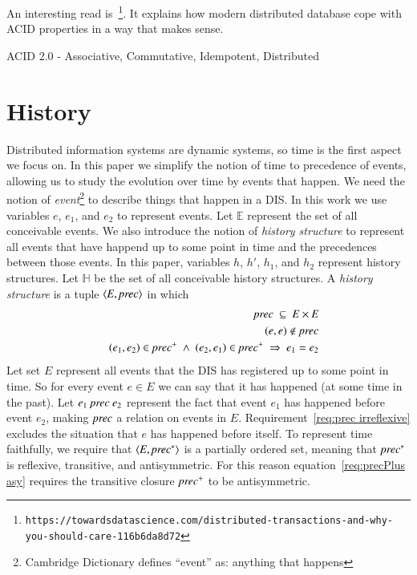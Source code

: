 \documentclass{elsarticle}
\def\id#1{\text{\em #1\/}}
\def\Events{{\mathit E}}
\begin{document}
	An interesting read is~\cite{Foster17c}\footnote{\tt\tiny https://towardsdatascience.com/distributed-transactions-and-why-you-should-care-116b6da8d72}.
	It explains how modern distributed database cope with ACID properties in a way that makes sense.

	ACID 2.0 - Associative, Commutative, Idempotent, Distributed

\section{History}
\label{sct:History}
	Distributed information systems are dynamic systems,
	so time is the first aspect we focus on.
	In this paper we simplify the notion of time to precedence of events,
	allowing us to study the evolution over time by events that happen.
	We need the notion of {\em event}\footnote{Cambridge Dictionary defines ``event'' as: anything that happens} to describe things that happen in a DIS.
	In this work we use variables $e$, $e_1$, and $e_2$ to represent events.
	Let $\mathbb E$ represent the set of all conceivable events.
	We also introduce the notion of {\em history structure}
	to represent all events that have happend up to some point in time and the precedences between those events.
	In this paper, variables $h$, $h'$, $h_1$, and $h_2$ represent history structures.
	Let $\mathbb H$ be the set of all conceivable history structures.
	A {\em history structure} is a tuple $\la \Events, \id{prec}\ra$ in which
\begin{eqnarray}
	&&\id{prec}\ \subseteq\ \Events\times\Events\label{req:precInE}\\
	&&(e,e)\notin\id{prec}\label{req:prec irreflexive}\\
	&&(e_1,e_2)\in\id{prec}^+\ \wedge\ (e_2,e_1)\in\id{prec}^+\ \Rightarrow\ e_1=e_2\label{req:precPlus asy}
\end{eqnarray}
	Let set $\Events$ represent all events that the DIS has registered up to some point in time.
	So for every event $e\in\Events$ we can say that it has happened (at some time in the past).
	Let $e_1\ \id{prec}\ e_2$ represent the fact that event $e_1$ has happened before event $e_2$,
	making $\id{prec}$ a relation on events in $\Events$.
	Requirement~\ref{req:prec irreflexive} excludes the situation that $e$ has happened before itself.
	To represent time faithfully, we require that $\la\Events,\id{prec}^*\ra$ is a partially ordered set,
	meaning that $\id{prec}^*$ is reflexive, transitive, and antisymmetric.
	For this reason equation~\ref{req:precPlus asy} requires the transitive closure $\id{prec}^+$ to be antisymmetric.
\end{document}
